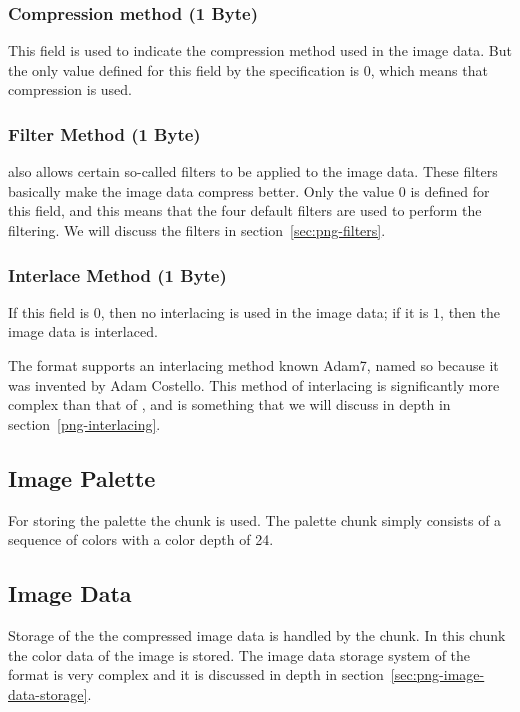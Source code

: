 \subsubsection*{Compression method (1 Byte)}

This field is used to indicate the compression method used in the
image data. But the only value defined for this field by the \png
specification is $0$, which means that  compression is used.

\subsubsection*{Filter Method (1 Byte)}

\png also allows certain so-called filters to be applied to the image
data. These filters basically make the image data compress
better. Only the value $0$ is defined for this field, and this means
that the four default filters are used to perform the filtering. We will
discuss the filters in section~\ref{sec:png-filters}.

\subsubsection*{Interlace Method (1 Byte)}

If this field is $0$, then no interlacing is used in the image data; if it
is $1$, then the image data is interlaced.

The \png format supports an interlacing method known Adam7, named so
because it was invented by Adam Costello. This method of interlacing
is significantly more complex than that of \gif, and is something
that we will discuss in depth in section~\ref{png-interlacing}.

\subsection{Image Palette}

For storing the palette the \plte chunk is used. The palette chunk
simply consists of a sequence of \rgb colors with a color depth of 24.

\subsection{Image Data}

Storage of the the compressed image data is handled by the \idat chunk. In
this chunk the color data of the image is stored. The image data
storage system of the \png format is very complex and it is discussed
in depth in section~\ref{sec:png-image-data-storage}.

